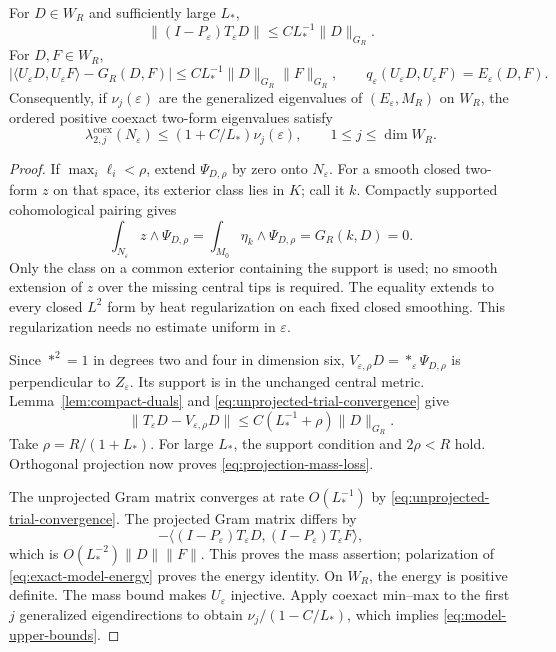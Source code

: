 \begin{proposition}\label{prop:trial-quotient-mass}
For $D\in W_R$ and sufficiently large $L_*$,
\begin{equation}\label{eq:projection-mass-loss}
 \|(I-P_\varepsilon)T_\varepsilon D\|
       \le C L_*^{-1}\|D\|_{G_R}.
\end{equation}
For $D,F\in W_R$,
\begin{equation}\label{eq:trial-gram}
 \bigl|\langle U_\varepsilon D,U_\varepsilon F\rangle
                         -G_R(D,F)\bigr|
       \le C L_*^{-1}\|D\|_{G_R}\|F\|_{G_R},\qquad
 q_\varepsilon(U_\varepsilon D,U_\varepsilon F)
       =E_\varepsilon(D,F).
\end{equation}
Consequently, if $\nu_j(\varepsilon)$ are the generalized
eigenvalues of $(E_\varepsilon,M_R)$ on $W_R$, the ordered positive
coexact two-form eigenvalues satisfy
\begin{equation}\label{eq:model-upper-bounds}
 \lambda^{\mathrm{coex}}_{2,j}(N_\varepsilon)
       \le(1+C/L_*)\nu_j(\varepsilon),\qquad
                   1\le j\le\dim W_R.
\end{equation}
\end{proposition}
\begin{proof}
If $\max_i\ell_i<\rho$, extend $\Psi_{D,\rho}$ by zero onto
$N_\varepsilon$. For a smooth closed two-form $z$ on that space,
its exterior class lies in $K$; call it $k$. Compactly supported
cohomological pairing gives
\[
 \int_{N_\varepsilon}z\wedge\Psi_{D,\rho}
     =\int_{M_0}\eta_k\wedge\Psi_{D,\rho}
     =G_R(k,D)=0.
\]
Only the class on a common exterior containing the support is used;
no smooth extension of $z$ over the missing central tips is required.
The equality extends to every closed $L^2$ form by heat regularization
on each fixed closed smoothing. This regularization needs no estimate
uniform in $\varepsilon$.

Since $*^2=1$ in degrees two and four in dimension six,
$V_{\varepsilon,\rho}D=*_\varepsilon\Psi_{D,\rho}$ is perpendicular
to $Z_\varepsilon$. Its support is in the unchanged central metric.
Lemma~\ref{lem:compact-duals} and
\eqref{eq:unprojected-trial-convergence} give
\[
 \|T_\varepsilon D-V_{\varepsilon,\rho}D\|
       \le C(L_*^{-1}+\rho)\|D\|_{G_R}.
\]
Take $\rho=R/(1+L_*)$. For large $L_*$, the support condition and
$2\rho<R$ hold. Orthogonal projection now proves
\eqref{eq:projection-mass-loss}.

The unprojected Gram matrix converges at rate $O(L_*^{-1})$ by
\eqref{eq:unprojected-trial-convergence}. The projected Gram matrix
differs by
\[
 -\langle(I-P_\varepsilon)T_\varepsilon D,
                (I-P_\varepsilon)T_\varepsilon F\rangle,
\]
which is $O(L_*^{-2})\|D\|\|F\|$. This proves the mass assertion;
polarization of \eqref{eq:exact-model-energy} proves the energy
identity. On $W_R$, the energy is positive definite. The mass bound
makes $U_\varepsilon$ injective. Apply coexact min--max to the first
$j$ generalized eigendirections to obtain
$\nu_j/(1-C/L_*)$, which implies \eqref{eq:model-upper-bounds}.
\end{proof}

